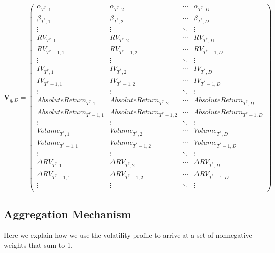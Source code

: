 \documentclass[11pt]{article}
\theoremstyle{definition}
\begin{document}
\begin{equation*}
\textbf{V}_{q,D} = 
\begin{pmatrix}
\alpha_{T^{*},1} & \alpha_{T^{*},2}  & \cdots & \alpha_{T^{*},D}  \\
\beta_{T^{*},1} & \beta_{T^{*},2}  & \cdots & \beta_{T^{*},D}  \\
\vdots  & \vdots  & \ddots & \vdots  \\
RV_{T^{*},1} & RV_{T^{*},2}  & \cdots & RV_{T^{*},D}  \\
RV_{T^{*}-1,1}  & RV_{T^{*}-1,2}  & \cdots & RV_{T^{*}-1,D}  \\
\vdots  & \vdots  & \ddots & \vdots  \\
IV_{T^{*},1} & IV_{T^{*},2} & \cdots & IV_{T^{*},D} \\
IV_{T^{*}-1,1}  & IV_{T^{*}-1,2}  & \cdots & IV_{T^{*}-1,D} \\
\vdots  & \vdots  & \ddots & \vdots  \\
AbsoluteReturn_{T^{*},1} & AbsoluteReturn_{T^{*},2} & \cdots & AbsoluteReturn_{T^{*},D} \\
AbsoluteReturn_{T^{*}-1,1}  & AbsoluteReturn_{T^{*}-1,2}  & \cdots & AbsoluteReturn_{T^{*}-1,D} \\
\vdots  & \vdots  & \ddots & \vdots  \\
Volume_{T^{*},1}  & Volume_{T^{*},2}  & \cdots & Volume_{T^{*},D} \\
Volume_{T^{*}-1,1}  & Volume_{T^{*}-1,2}  & \cdots & Volume_{T^{*}-1,D}  \\
\vdots  & \vdots  & \ddots & \vdots  \\
\Delta RV_{T^{*},1} & \Delta RV_{T^{*},2}  & \cdots & \Delta RV_{T^{*},D}  \\
\Delta RV_{T^{*}-1,1}  & \Delta RV_{T^{*}-1,2}  & \cdots & \Delta RV_{T^{*}-1,D}  \\
\vdots  & \vdots  & \ddots & \vdots  \\
\end{pmatrix}
\end{equation*}


\subsection{Aggregation Mechanism}
\label{Aggregation Mechanism}

Here we explain how we use the volatility profile to arrive at a set of nonnegative weights that sum to 1.
\end{document}

